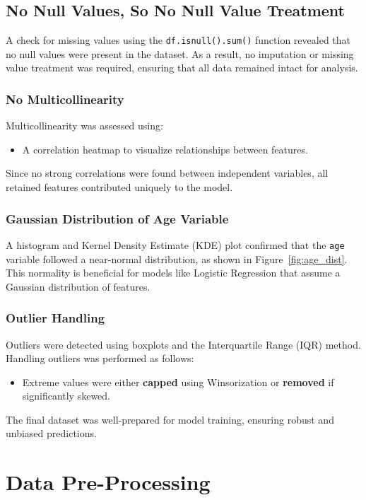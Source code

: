 \documentclass[12pt]{article}
\begin{document}
\subsection{No Null Values, So No Null Value Treatment}
A check for missing values using the \texttt{df.isnull().sum()} function revealed that no null values were present in the dataset. As a result, no imputation or missing value treatment was required, ensuring that all data remained intact for analysis.

\subsubsection{No Multicollinearity}
Multicollinearity was assessed using:
\begin{itemize}
    \item A correlation heatmap to visualize relationships between features.
\end{itemize}
Since no strong correlations were found between independent variables, all retained features contributed uniquely to the model.

\subsubsection{Gaussian Distribution of Age Variable}
A histogram and Kernel Density Estimate (KDE) plot confirmed that the \texttt{age} variable followed a near-normal distribution, as shown in Figure~\ref{fig:age_dist}. This normality is beneficial for models like Logistic Regression that assume a Gaussian distribution of features.


\subsubsection{Outlier Handling}
Outliers were detected using boxplots and the Interquartile Range (IQR) method. Handling outliers was performed as follows:
\begin{itemize}
    \item Extreme values were either \textbf{capped} using Winsorization or \textbf{removed} if significantly skewed.

\end{itemize}
The final dataset was well-prepared for model training, ensuring robust and unbiased predictions.

\section{Data Pre-Processing}
\end{document}
